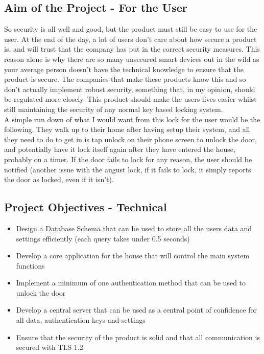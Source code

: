 \subsection{Aim of the Project - For the User}
So security is all well and good, but the product must still be easy to use for the user. At the end of the day, a lot of users don't care about how secure a product is, and will trust that the company has put in the correct security measures. This reason alone is why there are so many unsecured smart devices out in the wild as your average person doesn't have the technical knowledge to ensure that the product is secure. The companies that make these products know this and so don't actually implement robust security, something that, in my opinion, should be regulated more closely. This product should make the users lives easier whilst still maintaining the security of any normal key based locking system.
\\
\indent A simple run down of what I would want from this lock for the user would be the following. They walk up to their home after having setup their system, and all they need to do to get in is tap unlock on their phone screen to unlock the door, and potentially have it lock itself again after they have entered the house, probably on a timer. If the door fails to lock for any reason, the user should be notified (another issue with the august lock, if it fails to lock, it simply reports the door as locked, even if it isn't).

\subsection{Project Objectives - Technical}
\begin{itemize}
	\item Design a Database Schema that can be used to store all the users data and settings efficiently (each query takes under 0.5 seconds)
	\item Develop a core application for the house that will control the main system functions
	\item Implement a minimum of one authentication method that can be used to unlock the door
	\item Develop a central server that can be used as a central point of confidence for all data, authentication keys and settings
	\item Ensure that the security of the product is solid and that all communication is secured with TLS 1.2
\end{itemize}


